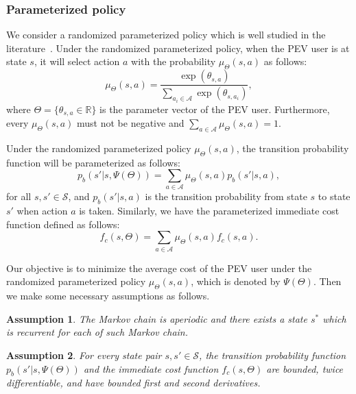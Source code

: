 \documentclass[twocolumn,10pt]{IEEEtran}
\newtheorem{assumption} {Assumption}
\begin{document}
\subsubsection{Parameterized policy}

We consider a randomized parameterized policy which is well studied in the literature~\cite{Marbach2001, Olivier2007, Baxter2001}. Under the randomized parameterized policy, when the PEV user is at state $s$, it will select action $a$ with the probability $\mu_{\Theta}(s,a)$ as follows:
\begin{equation}
\label{eq:randomized_parameterized_function}
\mu_{\Theta}(s,a) = \frac{\exp (\theta_{s,a})}{\sum_{a_i \in \mathcal{A}} \exp(\theta_{s,a_i})}	,
\end{equation}
where $\Theta = \{\theta_{s,a} \in \mathbb{R} \}$ is the parameter vector of the PEV user. Furthermore, every $\mu_{\Theta}(s,a)$ must not be negative and $\sum_{a\in \mathcal{A}} \mu_{\Theta} (s,a) =1$. 

Under the randomized parameterized policy $\mu_{\Theta}(s,a)$, the transition probability function will be parameterized as follows:
\begin{equation}
p_b(s'|s,\Psi(\Theta)) = \sum_{a \in \mathcal{A}} \mu_{\Theta}(s,a)	p_b(s'| s, a)	,
\end{equation}
for all $s, s' \in \mathcal{S}$, and $p_b(s'| s, a)$ is the transition probability from state $s$ to state $s'$ when action $a$ is taken. Similarly, we have the parameterized immediate cost function defined as follows:
\begin{equation}
\label{eq:average_throguhput_defination}
f_c (s, \Theta)	= \sum_{a \in \mathcal{A}} \mu_{\Theta}(s,a) f_c (s, a) .
\end{equation}

Our objective is to minimize the average cost of the PEV user under the randomized parameterized policy $\mu_{\Theta}(s,a)$, which is denoted by $\Psi(\Theta)$. Then we make some necessary assumptions as follows.
\begin{assumption}
\label{ass:recurrent_state}
The Markov chain is aperiodic and there exists a state $s^{*}$ which is recurrent for each of such Markov chain. 
\end{assumption}

\begin{assumption}
\label{ass:derivatives}
For every state pair $s, s' \in \mathcal{S}$, the transition probability function $p_b(s'|s,\Psi(\Theta))$ and the immediate cost function $f_c (s, \Theta)$ are bounded, twice differentiable, and have bounded first and second derivatives. 
\end{assumption}
\end{document}
